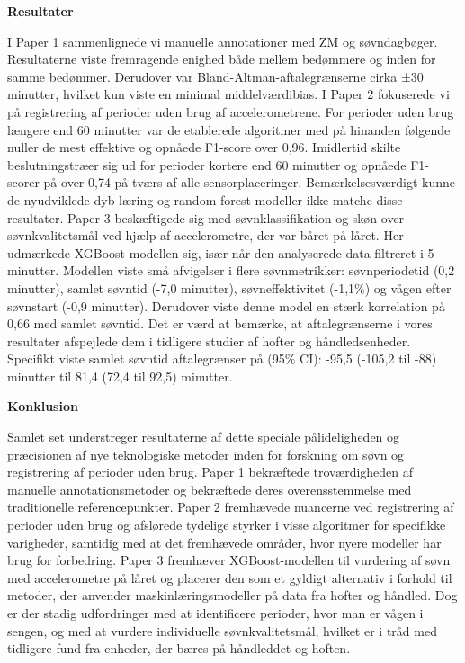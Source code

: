 \documentclass[
  9pt,
]{scrbook}
\begin{document}
\textbf{Resultater}

I Paper 1 sammenlignede vi manuelle annotationer med ZM og søvndagbøger.
Resultaterne viste fremragende enighed både mellem bedømmere og inden
for samme bedømmer. Derudover var Bland-Altman-aftalegrænserne cirka ±30
minutter, hvilket kun viste en minimal middelværdibias. I Paper 2
fokuserede vi på registrering af perioder uden brug af accelerometrene.
For perioder uden brug længere end 60 minutter var de etablerede
algoritmer med på hinanden følgende nuller de mest effektive og opnåede
F1-score over 0,96. Imidlertid skilte beslutningstræer sig ud for
perioder kortere end 60 minutter og opnåede F1-scorer på over 0,74 på
tværs af alle sensorplaceringer. Bemærkelsesværdigt kunne de nyudviklede
dyb-læring og random forest-modeller ikke matche disse resultater. Paper
3 beskæftigede sig med søvnklassifikation og skøn over søvnkvalitetsmål
ved hjælp af accelerometre, der var båret på låret. Her udmærkede
XGBoost-modellen sig, især når den analyserede data filtreret i 5
minutter. Modellen viste små afvigelser i flere søvnmetrikker:
søvnperiodetid (0,2 minutter), samlet søvntid (-7,0 minutter),
søvneffektivitet (-1,1\%) og vågen efter søvnstart (-0,9 minutter).
Derudover viste denne model en stærk korrelation på 0,66 med samlet
søvntid. Det er værd at bemærke, at aftalegrænserne i vores resultater
afspejlede dem i tidligere studier af hofter og håndledsenheder.
Specifikt viste samlet søvntid aftalegrænser på (95\% CI): -95,5 (-105,2
til -88) minutter til 81,4 (72,4 til 92,5) minutter.

\textbf{Konklusion}

Samlet set understreger resultaterne af dette speciale pålideligheden og
præcisionen af nye teknologiske metoder inden for forskning om søvn og
registrering af perioder uden brug. Paper 1 bekræftede troværdigheden af
manuelle annotationsmetoder og bekræftede deres overensstemmelse med
traditionelle referencepunkter. Paper 2 fremhævede nuancerne ved
registrering af perioder uden brug og afslørede tydelige styrker i visse
algoritmer for specifikke varigheder, samtidig med at det fremhævede
områder, hvor nyere modeller har brug for forbedring. Paper 3 fremhæver
XGBoost-modellen til vurdering af søvn med accelerometre på låret og
placerer den som et gyldigt alternativ i forhold til metoder, der
anvender maskinlæringsmodeller på data fra hofter og håndled. Dog er der
stadig udfordringer med at identificere perioder, hvor man er vågen i
sengen, og med at vurdere individuelle søvnkvalitetsmål, hvilket er i
tråd med tidligere fund fra enheder, der bæres på håndleddet og hoften.
\end{document}
